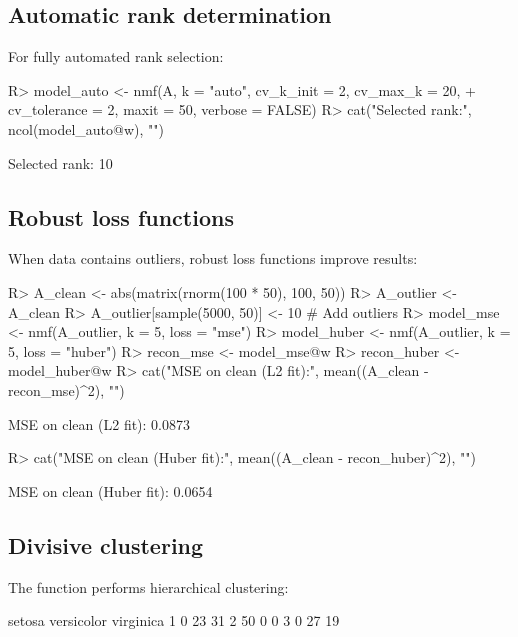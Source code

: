 \documentclass[article]{jss_modified}
\newcommand{\fct}[1]{\code{#1()}}
\begin{document}
\subsection{Automatic rank determination}

For fully automated rank selection:
%
\begin{CodeChunk}
\begin{CodeInput}
R> model_auto <- nmf(A, k = "auto", cv_k_init = 2, cv_max_k = 20,
+    cv_tolerance = 2, maxit = 50, verbose = FALSE)
R> cat("Selected rank:", ncol(model_auto@w), "\n")
\end{CodeInput}
\begin{CodeOutput}
Selected rank: 10
\end{CodeOutput}
\end{CodeChunk}

\subsection{Robust loss functions}

When data contains outliers, robust loss functions improve results:
%
\begin{CodeChunk}
\begin{CodeInput}
R> A_clean <- abs(matrix(rnorm(100 * 50), 100, 50))
R> A_outlier <- A_clean
R> A_outlier[sample(5000, 50)] <- 10  # Add outliers
R> model_mse <- nmf(A_outlier, k = 5, loss = "mse")
R> model_huber <- nmf(A_outlier, k = 5, loss = "huber")
R> recon_mse <- model_mse@w %
R> recon_huber <- model_huber@w %
R> cat("MSE on clean (L2 fit):", mean((A_clean - recon_mse)^2), "\n")
\end{CodeInput}
\begin{CodeOutput}
MSE on clean (L2 fit): 0.0873
\end{CodeOutput}
\begin{CodeInput}
R> cat("MSE on clean (Huber fit):", mean((A_clean - recon_huber)^2), "\n")
\end{CodeInput}
\begin{CodeOutput}
MSE on clean (Huber fit): 0.0654
\end{CodeOutput}
\end{CodeChunk}

\subsection{Divisive clustering}

The \fct{dclust} function performs hierarchical clustering:
%
\begin{CodeChunk}
\begin{CodeInput}
R> library("Matrix")
R> data("iris")
R> A <- as(as.matrix(iris[, 1:4]), "dgCMatrix")
R> clusters <- dclust(A, min_samples = 10)
R> table(sapply(clusters, `[[`, "id"), iris$Species)
\end{CodeInput}
\begin{CodeOutput}
       setosa versicolor virginica
  1         0         23        31
  2        50          0         0
  3         0         27        19
\end{CodeOutput}
\end{CodeChunk}
\end{document}
